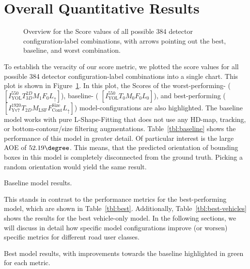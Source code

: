 
\section{Overall Quantitative Results}
\label{sec:baseline}

\begin{figure}[htb]
    
    \caption{Overview for the Score values of all possible 384 detector configuration-label combinations, with arrows pointing out the best, baseline, and worst combination.}
    \label{fig:all-scores}
\end{figure}

To establish the veracity of our score metric, we plotted the score values for all possible 384 detector configuration-label combinations into a single chart.
This plot is shown in Figure~\ref{fig:all-scores}.
In this plot, the Scores of the worst-performing- ($\left[I^{550}_\text{YOL}T^{2D}_{3D}M_1F_0L_{\uparrow}\right]$), baseline- ( $\left[I^{550}_\text{YOL}T_0M_0F_0L_0\right]$), and best-performing ($\left[I^{1920}_\text{Yv7}T_{2D}M_\text{LSF}F_\text{Cont}^\text{Size}L_{\uparrow}\right]$) model-configurations are also highlighted.
The baseline model works with pure L-Shape-Fitting that does not use any HD-map, tracking, or bottom-contour/size filtering augmentations.
Table~\ref{tbl:baseline} shows the performance of this model in greater detail.
Of particular interest is the large AOE of $52.19\degree$.
This means, that the predicted orientation of bounding boxes in this model is  completely disconnected from the ground truth.
Picking a random orientation would yield the same result.

\begin{table}[htbp]
    
    \caption{Baseline model results.}
    \label{tbl:baseline}
\end{table}

This stands in contrast to the performance metrics for the best-performing model, which are shown in Table~\ref{tbl:best}.
Additionally, Table~\ref{tbl:best-vehicles} shows the results for the best vehicle-only model.
In the following sections, we will discuss in detail how specific model configurations improve (or worsen) specific metrics for different road user classes.

\begin{table}[htbp]
    
    \caption{Best model results, with improvements towards the baseline highlighted in green for each metric.}
    \label{tbl:best}
\end{table}

